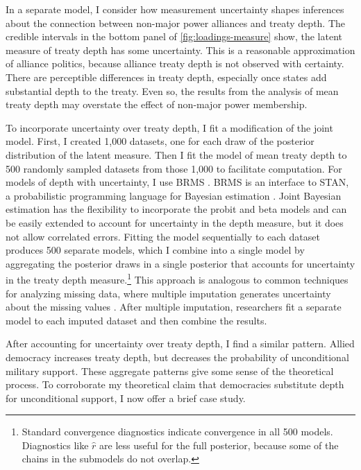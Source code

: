 \documentclass[12pt]{article}
\begin{document}
 
In a separate model, I consider how measurement uncertainty shapes inferences about the connection between non-major power alliances and treaty depth. 
The credible intervals in the bottom panel of \autoref{fig:loadings-measure} show, the latent measure of treaty depth has some uncertainty. 
This is a reasonable approximation of alliance politics, because alliance treaty depth is not observed with certainty. 
There are perceptible differences in treaty depth, especially once states add substantial depth to the treaty. 
Even so, the results from the analysis of mean treaty depth may overstate the effect of non-major power membership. 


To incorporate uncertainty over treaty depth, I fit a modification of the joint model. 
First, I created 1,000 datasets, one for each draw of the posterior distribution of the latent measure.
Then I fit the model of mean treaty depth to 500 randomly sampled datasets from those 1,000 to facilitate computation. 
For models of depth with uncertainty, I use BRMS \citep{Buerkner2017}. 
BRMS is an interface to STAN, a probabilistic programming language for Bayesian estimation \citep{Carpenteretal2016}. 
Joint Bayesian estimation has the flexibility to incorporate the probit and beta models and can be easily extended to account for uncertainty in the depth measure, but it does not allow correlated errors. 
Fitting the model sequentially to each dataset produces 500 separate models, which I combine into a single model by aggregating the posterior draws in a single posterior that accounts for uncertainty in the treaty depth measure.\footnote{Standard convergence diagnostics indicate convergence in all 500 models. Diagnostics like $\hat{r}$ are less useful for the full posterior, because some of the chains in the submodels do not overlap.}
This approach is analogous to common techniques for analyzing missing data, where multiple imputation generates uncertainty about the missing values \citep{Hollenbachetal2018imp}.
After multiple imputation, researchers fit a separate model to each imputed dataset and then combine the results. 


After accounting for uncertainty over treaty depth, I find a similar pattern. 
Allied democracy increases treaty depth, but decreases the probability of unconditional military support. 
These aggregate patterns give some sense of the theoretical process. 
To corroborate my theoretical claim that democracies substitute depth for unconditional support, I now offer a brief case study. 
\end{document}
